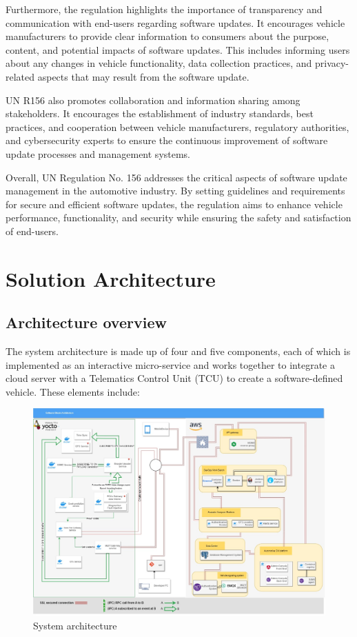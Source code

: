 \documentclass[
12pt,
oneside, 
onehalfspacing, 
nolistspacing, 
parskip, 
chapterinoneline, 
]{AASTCOMPUTER}
\begin{document}
Furthermore, the regulation highlights the importance of transparency and communication with end-users regarding software updates. It encourages vehicle manufacturers to provide clear information to consumers about the purpose, content, and potential impacts of software updates. This includes informing users about any changes in vehicle functionality, data collection practices, and privacy-related aspects that may result from the software update.

UN R156 also promotes collaboration and information sharing among stakeholders. It encourages the establishment of industry standards, best practices, and cooperation between vehicle manufacturers, regulatory authorities, and cybersecurity experts to ensure the continuous improvement of software update processes and management systems.

Overall, UN Regulation No. 156 addresses the critical aspects of software update management in the automotive industry. By setting guidelines and requirements for secure and efficient software updates, the regulation aims to enhance vehicle performance, functionality, and security while ensuring the safety and satisfaction of end-users.
\chapter{Solution Architecture}

\section{Architecture overview}
The system architecture is made up of four and five components, each of which is implemented as an interactive micro-service and works together to integrate a cloud server with a Telematics Control Unit (TCU) to create a software-defined vehicle. These elements include:


\begin{figure}[!ht]
	\centering
	\includegraphics[scale=0.4]{Figures/Architicture/overview.jpg}
  	\caption{System architecture}
  	\label{fig:System architecture}
\end{figure}
\newpage
\end{document}

